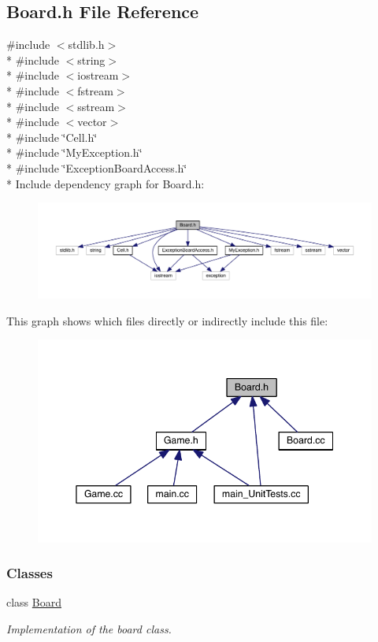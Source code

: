 \hypertarget{a00093}{}\subsection{Board.\+h File Reference}
\label{a00093}
{\ttfamily \#include $<$stdlib.\+h$>$}\\*
{\ttfamily \#include $<$string$>$}\\*
{\ttfamily \#include $<$iostream$>$}\\*
{\ttfamily \#include $<$fstream$>$}\\*
{\ttfamily \#include $<$sstream$>$}\\*
{\ttfamily \#include $<$vector$>$}\\*
{\ttfamily \#include \char`\"{}Cell.\+h\char`\"{}}\\*
{\ttfamily \#include \char`\"{}My\+Exception.\+h\char`\"{}}\\*
{\ttfamily \#include \char`\"{}Exception\+Board\+Access.\+h\char`\"{}}\\*
Include dependency graph for Board.\+h\+:\nopagebreak
\begin{figure}[H]
\begin{center}
\leavevmode
\includegraphics[width=350pt]{a00127}
\end{center}
\end{figure}
This graph shows which files directly or indirectly include this file\+:\nopagebreak
\begin{figure}[H]
\begin{center}
\leavevmode
\includegraphics[width=345pt]{a00128}
\end{center}
\end{figure}
\subsubsection*{Classes}
\begin{DoxyCompactItemize}
\item 
class \hyperlink{a00009}{Board}
\begin{DoxyCompactList}\small\item\em Implementation of the board class. \end{DoxyCompactList}\end{DoxyCompactItemize}
